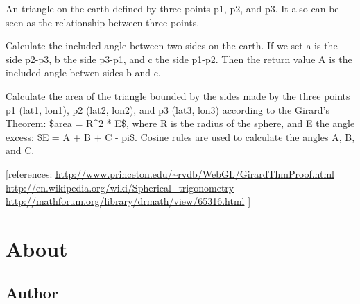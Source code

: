 \documentclass[letterpaper,10pt,english]{sphinxmanual}
\begin{document}
\begin{fulllineitems}
\label{code:pyesg.Triangle}
An triangle on the earth defined by three points p1, p2, and p3.
It also can be seen as the relationship between three points.

\begin{fulllineitems}
\label{code:pyesg.Triangle.angles}
Calculate the included angle between two sides on the earth.
If we set a is the side p2-p3, b the side p3-p1, and c the side p1-p2.
Then the return value A is the included angle betwen sides b and c.

\end{fulllineitems}


\begin{fulllineitems}
\label{code:pyesg.Triangle.area}
Calculate the area of the triangle bounded by the sides made by the
three points p1 (lat1, lon1), p2 (lat2, lon2), and p3 (lat3, lon3)
according to the Girard's Theorem:
\$area = R\textasciicircum{}2 * E\$,
where R is the radius of the sphere, and E the angle excess:
\$E = A + B + C - pi\$.
Cosine rules are used to calculate the angles A, B, and C.

{[}references:
\href{http://www.princeton.edu/~rvdb/WebGL/GirardThmProof.html}{http://www.princeton.edu/\textasciitilde{}rvdb/WebGL/GirardThmProof.html}
\href{http://en.wikipedia.org/wiki/Spherical\_trigonometry}{http://en.wikipedia.org/wiki/Spherical\_trigonometry}
\href{http://mathforum.org/library/drmath/view/65316.html}{http://mathforum.org/library/drmath/view/65316.html}
{]}

\end{fulllineitems}


\end{fulllineitems}



\chapter{About}
\label{about::doc}\label{about:about}

\section{Author}
\label{about:author}
\end{document}
